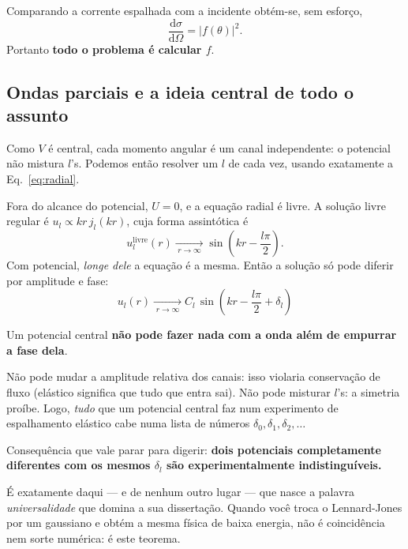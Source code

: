 \documentclass[11pt,a4paper]{article}
\newcommand{\dd}{\mathrm{d}}
\begin{document}
Comparando a corrente espalhada com a incidente obtém-se, sem esforço,
\begin{equation}
\frac{\dd\sigma}{\dd\Omega} = |f(\theta)|^{2}.
\end{equation}
Portanto \textbf{todo o problema é calcular $f$}.

\subsection{Ondas parciais e a ideia central de todo o assunto}

Como $V$ é central, cada momento angular é um canal independente: o potencial não
mistura $l$'s. Podemos então resolver um $l$ de cada vez, usando exatamente a
Eq.~\eqref{eq:radial}.

Fora do alcance do potencial, $U=0$, e a equação radial é livre. A solução livre
regular é $u_{l}\propto kr\,j_{l}(kr)$, cuja forma assintótica é
\begin{equation}
u_{l}^{\text{livre}}(r)\xrightarrow[\;r\to\infty\;]{} \sin\!\left(kr-\frac{l\pi}{2}\right).
\end{equation}
Com potencial, \emph{longe dele} a equação é a mesma. Então a solução só pode diferir
por amplitude e fase:
\begin{equation}
\boxed{\;u_{l}(r)\xrightarrow[\;r\to\infty\;]{} C_{l}\,\sin\!\left(kr-\frac{l\pi}{2}+\delta_{l}\right)\;}
\label{eq:fase}
\end{equation}

\begin{ideia}
Um potencial central \textbf{não pode fazer nada com a onda além de empurrar a fase
dela}.

Não pode mudar a amplitude relativa dos canais: isso violaria conservação de fluxo
(elástico significa que tudo que entra sai). Não pode misturar $l$'s: a simetria
proíbe. Logo, \emph{tudo} que um potencial central faz num experimento de
espalhamento elástico cabe numa lista de números $\delta_{0},\delta_{1},\delta_{2},\dots$

Consequência que vale parar para digerir: \textbf{dois potenciais completamente
diferentes com os mesmos $\delta_{l}$ são experimentalmente indistinguíveis.}

É exatamente daqui — e de nenhum outro lugar — que nasce a palavra
\emph{universalidade} que domina a sua dissertação. Quando você troca o Lennard-Jones
por um gaussiano e obtém a mesma física de baixa energia, não é coincidência nem
sorte numérica: é este teorema.
\end{ideia}
\end{document}
